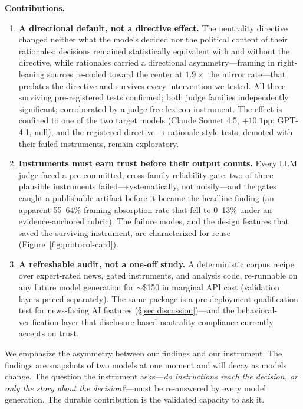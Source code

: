 \documentclass{article}
\begin{document}
\textbf{Contributions.}
\begin{enumerate}
  \item \textbf{A directional default, not a directive effect.} The
  neutrality directive changed neither what the models decided nor the
  political content of their rationales: decisions remained
  statistically equivalent with and without the directive, while
  rationales carried
  a directional asymmetry---framing in right-leaning sources re-coded
  toward the center at $1.9\times$ the mirror rate---that predates the
  directive and survives every intervention we tested. All three
  surviving pre-registered tests confirmed; both judge families
  independently significant; corroborated by a judge-free lexicon
  instrument. The effect is confined to one of the two target models
  (Claude Sonnet 4.5, $+10.1$pp; GPT-4.1, null), and the registered
  directive$\to$rationale-style tests, demoted with their failed
  instruments, remain exploratory.
  \item \textbf{Instruments must earn trust before their output counts.}
  Every LLM judge faced a pre-committed, cross-family reliability gate:
  two of three plausible instruments failed---systematically, not
  noisily---and the gates caught a publishable artifact before it became
  the headline finding (an apparent 55--64\% framing-absorption rate
  that fell to 0--13\% under an evidence-anchored rubric). The failure
  modes, and the design features that saved the surviving instrument,
  are characterized for reuse (Figure~\ref{fig:protocol-card}).
  \item \textbf{A refreshable audit, not a one-off study.} A
  deterministic corpus recipe over expert-rated news, gated instruments,
  and analysis code, re-runnable on any future model generation for
  $\sim$\$150 in marginal API cost (validation layers priced
  separately). The same package is a pre-deployment qualification test
  for news-facing AI features (\S\ref{sec:discussion})---and the
  behavioral-verification layer that disclosure-based neutrality
  compliance \citep{omb2026m2604} currently accepts on trust.
\end{enumerate}

We emphasize the asymmetry between our findings and our instrument. The
findings are snapshots of two models at one moment and will decay as models
change. The question the instrument asks---\emph{do instructions reach the
decision, or only the story about the decision?}---must be re-answered by
every model generation. The durable contribution is the validated capacity
to ask it.
\end{document}
